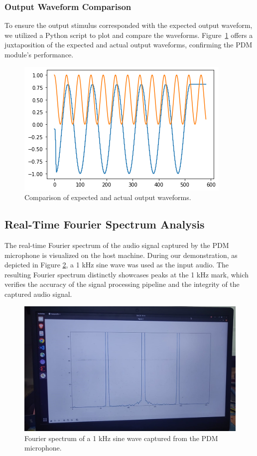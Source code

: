 \subsubsection{Output Waveform Comparison}
To ensure the output stimulus corresponded with the expected output waveform, we utilized a Python script to plot and compare the waveforms. Figure~\ref{fig:expected_vs_actual_output} offers a juxtaposition of the expected and actual output waveforms, confirming the PDM module's performance.


\begin{figure}[h!]
\centering
\includegraphics[width=.4\linewidth]{Sections/RESULTS/Images/exp_vs_actual.png}
\caption{Comparison of expected and actual output waveforms.}
\label{fig:expected_vs_actual_output}
\end{figure}


\subsection{Real-Time Fourier Spectrum Analysis}

The real-time Fourier spectrum of the audio signal captured by the PDM microphone is visualized on the host machine. During our demonstration, as depicted in Figure \ref{fig:fourier_spectrum}, a 1 kHz sine wave was used as the input audio. The resulting Fourier spectrum distinctly showcases peaks at the 1 kHz mark, which verifies the accuracy of the signal processing pipeline and the integrity of the captured audio signal.

\begin{figure}[htbp]
\centering
\includegraphics[width=.4\textwidth]{Sections/RESULTS/Images/realtime-fft.jpeg}
\caption{Fourier spectrum of a 1 kHz sine wave captured from the PDM microphone.}
\label{fig:fourier_spectrum}
\end{figure}



